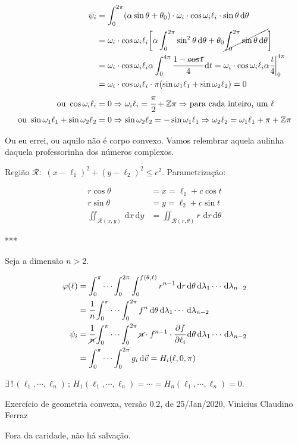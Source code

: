 \documentclass[12pt]{article}
\begin{document}
\begin{align}
\psi_i &= \int_0^{2\pi} (\alpha \sin \theta + \theta_0)\cdot \omega_i \cdot \cos \omega_i \ell_i \cdot \sin \theta \,\mathrm{d}\theta \\
&= \omega_i \cdot \cos \omega_i \ell_i \bigg[\alpha \int_0^{2\pi} \sin^2 \theta \,\mathrm{d}\theta + \theta_0 \cancel{\int_0^{2\pi} \sin \theta \,\mathrm{d}\theta} \bigg] \\
&= \omega_i \cdot \cos \omega_i \ell_i \alpha \int_0^{4\pi} \cfrac{1 - \cancel{\cos t}}{4} \,\mathrm{d}t = \omega_i \cdot \cos \omega_i \ell_i \alpha \cfrac{t}{4} \bigg\vert_0^{4\pi} \\
&= \omega_i \cdot \cos \omega_i \ell_i \cdot \pi (\sin \omega_1 \ell_1 + \sin \omega_2 \ell_2) = 0 \\
\text{ou }\cos \omega_i \ell_i &= 0 \Rightarrow \omega_i \ell_i = \cfrac{\pi}{2} + \mathbb{Z}\pi \Rightarrow \text{para cada inteiro, um }\ell \\
\text{ou }\sin \omega_1 \ell_1 + \sin \omega_2 \ell_2 &= 0 \Rightarrow \sin \omega_2 \ell_2 = - \sin \omega_1 \ell_1 \Rightarrow \omega_2 \ell_2 = \omega_1 \ell_1 + \pi + \mathbb{Z}\pi
\end{align}

Ou eu errei, ou aquilo n\~ao \'e corpo convexo. Vamos relembrar aquela aulinha daquela professorinha dos n\'umeros complexos.

Regi\~ao $\mathcal{R}:\,\,(x - \ell_1)^2 + (y - \ell_2)^2 \le c^2$. Parametriza\c{c}\~ao:

\begin{align}
r \cos \theta &= x = \ell_1 + c \cos t \\
r \sin \theta &= y = \ell_2 + c \sin t \\
\iint_{\mathcal{R}(x,y)} \,\mathrm{d}x\,\mathrm{d}y &= \iint_{\mathcal{R}(r,\theta)} r\,\,\mathrm{d}r\,\mathrm{d}\theta
\end{align}

***

\vspace{300mm}

Seja a dimens\~ao $n > 2$.

\begin{align}
\varphi(\ell) &= \int_0^{\pi} \cdots \int_0^{2\pi} \int_0^{f(\theta, \ell)} r^{n-1} \,\mathrm{d}r\,\mathrm{d}\theta\,\mathrm{d}\lambda_1 \cdots \,\mathrm{d}\lambda_{n-2} \\
&= \cfrac{1}{n} \int_0^{\pi} \cdots \int_0^{2\pi} f^n\,\mathrm{d}\theta\,\mathrm{d}\lambda_1 \cdots \,\mathrm{d}\lambda_{n-2} \\
\psi_i &= \cfrac{1}{\cancel{n}} \int_0^{\pi} \cdots \int_0^{2\pi} \cancel{n}\cdot f^{n - 1}\cdot\cfrac{\partial f}{\partial \ell_i}\,\mathrm{d}\theta\,\mathrm{d}\lambda_1 \cdots \,\mathrm{d}\lambda_{n-2} \\
&= \int_0^{\pi} \cdots \int_0^{2\pi}g_i\,\mathrm{d}\vec v = H_i(\ell, 0, \pi)
\end{align}

$\exists \,!\,(\ell_1,\cdots,\ell_n)\,;\,H_1(\ell_1,\cdots,\ell_n) = \cdots = H_n(\ell_1, \cdots, \ell_n) = 0$.

\vspace{3mm}

Exerc\'icio de geometria convexa, vers\~ao $0.2$, de 25/Jan/2020, Vinicius Claudino Ferraz

\vspace{3mm}

Fora da caridade, n\~ao h\'a salva\c{c}\~ao.
\end{document}
